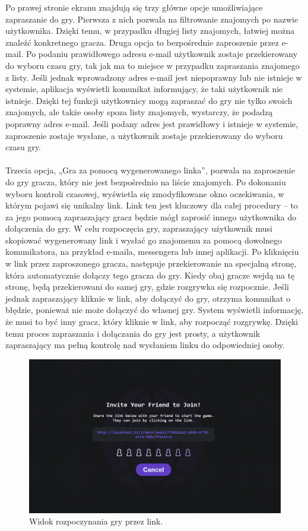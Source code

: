 \documentclass[12pt,a4paper]{article}
\begin{document}
Po prawej stronie ekranu znajdują się trzy główne opcje umożliwiające zapraszanie do gry. Pierwsza z nich pozwala na filtrowanie znajomych po nazwie użytkownika. Dzięki temu, w przypadku długiej listy znajomych, łatwiej można znaleźć konkretnego gracza. Druga opcja to bezpośrednie zaproszenie przez e-mail. Po podaniu prawidłowego adresu e-mail użytkownik zostaje przekierowany do wyboru czasu gry, tak jak ma to miejsce w przypadku zapraszania znajomego z listy. Jeśli jednak wprowadzony adres e-mail jest niepoprawny lub nie istnieje w systemie, aplikacja wyświetli komunikat informujący, że taki użytkownik nie istnieje. Dzięki tej funkcji użytkownicy mogą zapraszać do gry nie tylko swoich znajomych, ale także osoby spoza listy znajomych, wystarczy, że podadzą poprawny adres e-mail. Jeśli podany adres jest prawidłowy i istnieje w systemie, zaproszenie zostaje wysłane, a użytkownik zostaje przekierowany do wyboru czasu gry.
\\\\
Trzecia opcja, „Gra za pomocą wygenerowanego linka”, pozwala na zaproszenie do gry gracza, który nie jest bezpośrednio na liście znajomych. Po dokonaniu wyboru kontroli czasowej, wyświetla się zmodyfikowane okno oczekiwania, w którym pojawi się unikalny link. Link ten jest kluczowy dla całej procedury – to za jego pomocą zapraszający gracz będzie mógł zaprosić innego użytkownika do dołączenia do gry. W celu rozpoczęcia gry, zapraszający użytkownik musi skopiować wygenerowany link i wysłać go znajomemu za pomocą dowolnego komunikatora, na przykład e-maila, messengera lub innej aplikacji. Po kliknięciu w link przez zaproszonego gracza, następuje przekierowanie na specjalną stronę, która automatycznie dołączy tego gracza do gry. Kiedy obaj gracze wejdą na tę stronę, będą przekierowani do samej gry, gdzie rozgrywka się rozpocznie. Jeśli jednak zapraszający kliknie w link, aby dołączyć do gry, otrzyma komunikat o błędzie, ponieważ nie może dołączyć do własnej gry. System wyświetli informację, że musi to być inny gracz, który kliknie w link, aby rozpocząć rozgrywkę. Dzięki temu proces zapraszania i dołączania do gry jest prosty, a użytkownik zapraszający ma pełną kontrolę nad wysłaniem linku do odpowiedniej osoby.

\begin{figure}[h!]
    \centering
    \includegraphics[width=1\textwidth]{zdj/ins_min_link.png}
    \caption{Widok rozpoczynania gry przez link.}
\end{figure}
\end{document}
